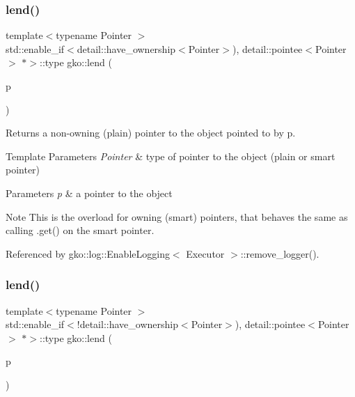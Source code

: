 \subsubsection{\texorpdfstring{lend()}{lend()}\hspace{0.1cm}{\footnotesize\ttfamily [1/2]}}
{\footnotesize\ttfamily template$<$typename Pointer $>$ \\
std\+::enable\+\_\+if$<$detail\+::have\+\_\+ownership$<$Pointer$>$), detail\+::pointee$<$Pointer$>$ $\ast$$>$\+::type gko\+::lend (\begin{DoxyParamCaption}\item[{const Pointer \&}]{p }\end{DoxyParamCaption})\hspace{0.3cm}{\ttfamily [inline]}}



Returns a non-\/owning (plain) pointer to the object pointed to by {\ttfamily p}. 


\begin{DoxyTemplParams}{Template Parameters}
{\em Pointer} & type of pointer to the object (plain or smart pointer)\\
\hline
\end{DoxyTemplParams}

\begin{DoxyParams}{Parameters}
{\em p} & a pointer to the object\\
\hline
\end{DoxyParams}
\begin{DoxyNote}{Note}
This is the overload for owning (smart) pointers, that behaves the same as calling .get() on the smart pointer. 
\end{DoxyNote}


Referenced by gko\+::log\+::\+Enable\+Logging$<$ Executor $>$\+::remove\+\_\+logger().

\mbox{\label{namespacegko_aa0c1deeb105cfb5a635b5f41cb5e8321}} 
\subsubsection{\texorpdfstring{lend()}{lend()}\hspace{0.1cm}{\footnotesize\ttfamily [2/2]}}
{\footnotesize\ttfamily template$<$typename Pointer $>$ \\
std\+::enable\+\_\+if$<$!detail\+::have\+\_\+ownership$<$Pointer$>$), detail\+::pointee$<$Pointer$>$ $\ast$$>$\+::type gko\+::lend (\begin{DoxyParamCaption}\item[{const Pointer \&}]{p }\end{DoxyParamCaption})\hspace{0.3cm}{\ttfamily [inline]}}



